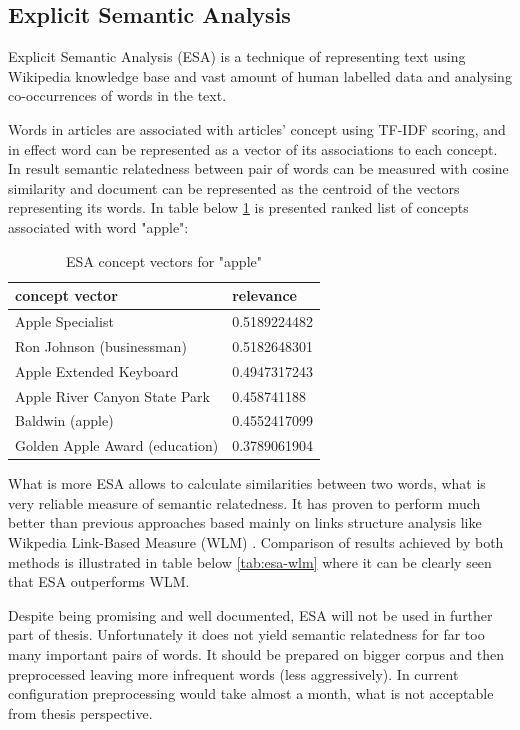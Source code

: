 \documentclass[a4paper, 12pt, oneside]{Thesis} %
\begin{document}
\subsection{Explicit Semantic Analysis} Explicit Semantic Analysis (ESA) \cite{gabrilovich2009wikipedia} is a technique of representing text using Wikipedia knowledge base and vast amount of human labelled data and analysing co-occurrences of words in the text. 

Words in articles are associated with articles' concept using TF-IDF scoring, and in effect word can be represented as a vector of its associations to each concept. In result semantic relatedness between pair of words can be measured with cosine similarity and document can be represented as the centroid of the vectors representing its words. In table below \ref{tab:esa-apple} is presented ranked list of concepts associated with word "apple":

\begin{table}[th]
\centering
 \begin{tabular}{| l | l |}
\hline
concept vector & relevance \\ \hline
Apple Specialist & 0.5189224482 \\ \hline
Ron Johnson (businessman) & 0.5182648301 \\ \hline
Apple Extended Keyboard & 0.4947317243 \\ \hline
Apple River Canyon State Park & 0.458741188 \\ \hline
Baldwin (apple) & 0.4552417099 \\ \hline
Golden Apple Award (education) & 0.3789061904 \\ \hline
 \end{tabular}
\caption{ESA concept vectors for "apple"}
\label{tab:esa-apple}
\end{table}

What is more ESA allows to calculate similarities between two words, what is very reliable measure of semantic relatedness. It has proven to perform much better than previous approaches based mainly on links structure analysis like Wikpedia Link-Based Measure (WLM) \cite{witten2008effective}. Comparison of results achieved by both methods is illustrated in table below \ref{tab:esa-wlm} where it can be clearly seen that ESA outperforms WLM. 

Despite being promising and well documented, ESA will not be used in further part of thesis. Unfortunately it does not yield semantic relatedness for far too many important pairs of words. It should be prepared on bigger corpus and then preprocessed leaving more infrequent words (less aggressively). In current configuration preprocessing would take almost a month, what is not acceptable from thesis perspective. 
\end{document}
